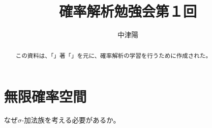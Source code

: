 \documentclass[dvipdfmx]{article}
\title{確率解析勉強会第１回}
\author{中津陽}
\begin{document}
\maketitle

\begin{abstract}
 この資料は、「」著「」を元に、確率解析の学習を行うために作成された。
\end{abstract}

\section{無限確率空間}
 なぜ$\sigma$-加法族を考える必要があるか。 




 
\end{document}
